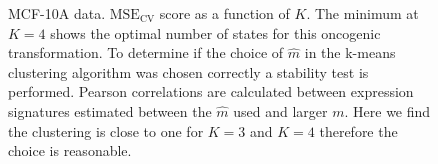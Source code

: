 \begin{figure}
  \centering
    \caption{MCF-10A data.  $\mathrm{MSE_{CV}}$ score as a function of $K$. The minimum at $K = 4$ shows the optimal number of states for this oncogenic transformation.  To determine if the choice of $\hat{m}$ in the k-means clustering algorithm was chosen correctly a stability test is performed. Pearson correlations are calculated between expression signatures estimated between the $\hat{m}$ used and larger $m$. Here we find the clustering is close to one for $K=3$ and $K=4$ therefore the choice is reasonable.}
  \label{fig:data-m-k}
\end{figure}

